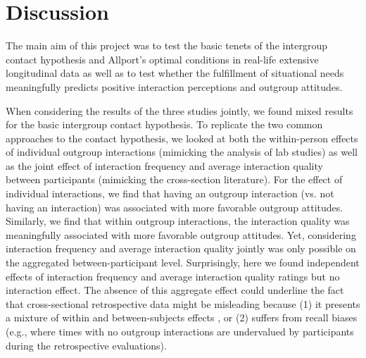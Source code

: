 \documentclass[man, 12pt, a4paper, mask]{apa7}
\theoremstyle{break}
\theoremstyle{plain}
\begin{document}


\section{Discussion}
The main aim of this project was to test the basic tenets of the intergroup contact hypothesis and Allport's optimal conditions in real-life extensive longitudinal data as well as to test whether the fulfillment of situational needs meaningfully predicts positive interaction perceptions and outgroup attitudes. 

When considering the results of the three studies jointly, we found mixed results for the basic intergroup contact hypothesis. To replicate the two common approaches to the contact hypothesis, we looked at both the within-person effects of individual outgroup interactions (mimicking the analysis of lab studies) as well as the joint effect of interaction frequency and average interaction quality between participants (mimicking the cross-section literature). For the effect of individual interactions, we find that having an outgroup interaction (vs. not having an interaction) was associated with more favorable outgroup attitudes. Similarly, we find that within outgroup interactions, the interaction quality was meaningfully associated with more favorable outgroup attitudes. Yet, considering interaction frequency and average interaction quality jointly was only possible on the aggregated between-participant level. Surprisingly, here we found independent effects of interaction frequency and average interaction quality ratings but no interaction effect. The absence of this aggregate effect could underline the fact that cross-sectional retrospective data might be misleading because (1) it presents a mixture of within and between-subjects effects \citep[][]{Hamaker2020}, or (2) suffers from recall biases (e.g., where times with no outgroup interactions are undervalued by participants during the retrospective evaluations). 
\end{document}
